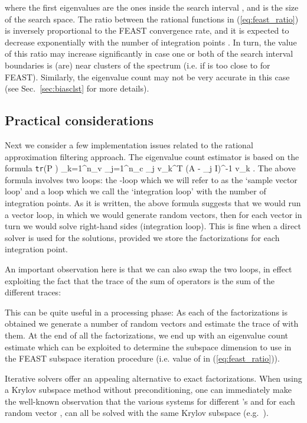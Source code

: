 \documentclass[12pt]{article}		\usepackage{tabls,multirow}
\def\trace{\mbox{\tt tr}}
\def\inv{^{-1}}\def\backw{{\bf B}}\def\diag{\mbox{Diag}\,}
\newcommand{\eq}[1]{}
\begin{document}
where the first  eigenvalues  are the ones
inside the search interval , and  is the size of the
search space. The ratio between the rational functions in
(\ref{eq:feast_ratio}) is inversely proportional to the FEAST
convergence rate, and it is expected to decrease exponentially with
the number of integration points . In turn, the value of this ratio
may increase significantly in case one or both of the search interval
boundaries is (are) near clusters of the spectrum (i.e. if  is
too close to  for FEAST). Similarly, the eigenvalue
count may not be very accurate in this case (see
Sec.~\ref{sec:biasclst} for more details).


\subsection{Practical considerations}
\label{sec:cons} 
Next we consider a few implementation issues related to the rational
approximation filtering approach.  The eigenvalue count estimator is
based on the formula \eq{eq:est} \trace (P ) \approx {}
\sum_{k=1}^{n_v} \sum_{j=1}^{n_c} \omega_j v_k^T (A - \sigma_j I)\inv
v_k .  \en The above formula involves two loops: the -loop which we
will refer to as the `sample vector loop' and a  loop which we call
the `integration loop' with  the number of integration points.
As it is written, the above formula suggests that we would run a
vector loop, in which we would generate random vectors, then for each
vector in turn we would solve  right-hand sides (integration loop).
This is fine when a direct solver is used for the solutions, provided
we store the factorizations for each integration point.
 
An important observation here is that we can also swap the two loops,
in effect exploiting the fact that the trace of the sum of operators
is the sum of the different traces:

This can be quite useful in a processing phase: As each of the 
 factorizations is obtained we generate a number of random vectors
and estimate the trace of  with them. At the end of all
the factorizations, we end up with an eigenvalue count estimate 
which can be exploited to determine the subspace dimension to use
in the FEAST subspace iteration procedure (i.e. value of  in (\ref{eq:feast_ratio})).

Iterative solvers offer an appealing alternative to exact factorizations.
When using a Krylov subspace method without preconditioning,
one can immediately make the well-known observation that the
various systems  for different 's 
and for each random  vector , can all be solved with the same Krylov
subspace (e.g.~\cite{LopezSimoncini06}).  
\end{document}
